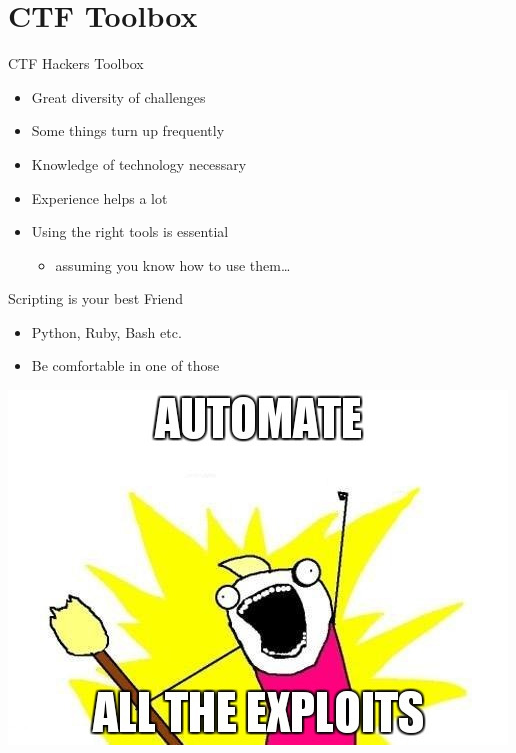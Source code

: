 \section{CTF Toolbox}

\begin{frame}
  {CTF Hackers Toolbox}

  \begin{itemize}
    \item Great diversity of challenges
    \item Some things turn up frequently
    \item Knowledge of technology necessary
    \item Experience helps a lot
  \end{itemize}

  \begin{itemize}
    \item Using the right tools is essential
      \begin{itemize}
        \item assuming you know how to use them\ldots
      \end{itemize}
  \end{itemize}

\end{frame}

\begin{frame}
  {Scripting is your best Friend}

  \begin{itemize}
    \item Python, Ruby, Bash etc.
    \item Be comfortable in one of those
  \end{itemize}

  \begin{center}
    \includegraphics[height=0.5\textheight]{images/automatealltheexploits.jpg}
  \end{center}
\end{frame}


